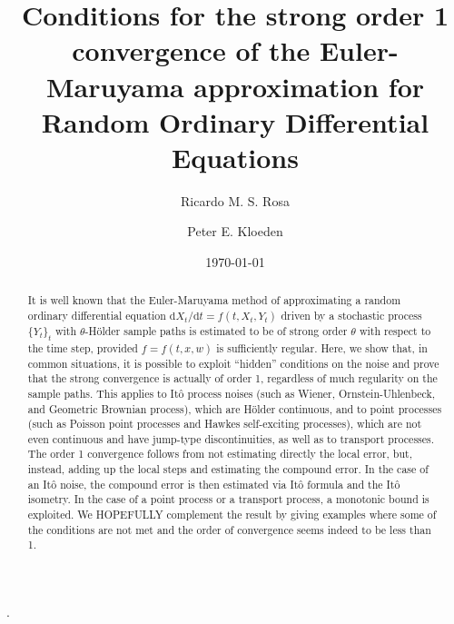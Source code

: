 \documentclass[reqno,12pt]{amsart}
\theoremstyle{plain}%
\theoremstyle{definition}
\begin{document}


\title[Strong order 1 convergence of Euler-Maruyama for Random ODEs]{Conditions for the strong order 1 convergence of the Euler-Maruyama approximation for Random Ordinary Differential Equations}

\author[R. M. S. Rosa]{Ricardo M. S. Rosa}

\author[P. E. Kloeden]{Peter E. Kloeden}

\address[Ricardo M. S. Rosa]{Instituto de Matem\'atica, Universidade Federal do Rio de Janeiro, Brazil}
\address[Peter E. Kloeden]{Mathematics Department, University of Tubingen, Germany}


\date{\today}


.

\begin{abstract}
It is well known that the Euler-Maruyama method of approximating a random ordinary differential equation $\mathrm{d}X_t/\mathrm{d}t = f(t, X_t, Y_t)$ driven by a stochastic process $\{Y_t\}_t$ with $\theta$-H\"older sample paths is estimated to be of strong order $\theta$ with respect to the time step, provided $f=f(t, x, w)$ is sufficiently regular. Here, we show that, in common situations, it is possible to exploit ``hidden'' conditions on the noise and prove that the strong convergence is actually of order 1, regardless of much regularity on the sample paths. This applies to It\^o process noises (such as Wiener, Ornstein-Uhlenbeck, and Geometric Brownian process), which are H\"older continuous, and to point processes (such as Poisson point processes and Hawkes self-exciting processes), which are not even continuous and have jump-type discontinuities, as well as to transport processes. The order 1 convergence follows from not estimating directly the local error, but, instead, adding up the local steps and estimating the compound error. In the case of an It\^o noise, the compound error is then estimated via It\^o formula and the It\^o isometry. In the case of a point process or a transport process, a monotonic bound is exploited. We HOPEFULLY complement the result by giving examples where some of the conditions are not met and the order of convergence seems indeed to be less than 1.
\end{abstract}
\end{document}
